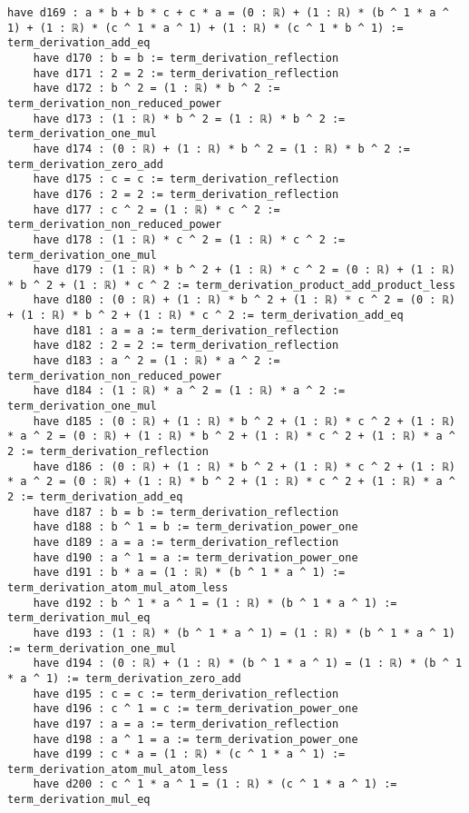 \documentclass{article}
\begin{document}
\begin{tcolorbox}[colback=white!10, width=\linewidth]
\begin{lstlisting}[language=Lean4]
    have d169 : a * b + b * c + c * a = (0 : ℝ) + (1 : ℝ) * (b ^ 1 * a ^ 1) + (1 : ℝ) * (c ^ 1 * a ^ 1) + (1 : ℝ) * (c ^ 1 * b ^ 1) := term_derivation_add_eq
    have d170 : b = b := term_derivation_reflection
    have d171 : 2 = 2 := term_derivation_reflection
    have d172 : b ^ 2 = (1 : ℝ) * b ^ 2 := term_derivation_non_reduced_power
    have d173 : (1 : ℝ) * b ^ 2 = (1 : ℝ) * b ^ 2 := term_derivation_one_mul
    have d174 : (0 : ℝ) + (1 : ℝ) * b ^ 2 = (1 : ℝ) * b ^ 2 := term_derivation_zero_add
    have d175 : c = c := term_derivation_reflection
    have d176 : 2 = 2 := term_derivation_reflection
    have d177 : c ^ 2 = (1 : ℝ) * c ^ 2 := term_derivation_non_reduced_power
    have d178 : (1 : ℝ) * c ^ 2 = (1 : ℝ) * c ^ 2 := term_derivation_one_mul
    have d179 : (1 : ℝ) * b ^ 2 + (1 : ℝ) * c ^ 2 = (0 : ℝ) + (1 : ℝ) * b ^ 2 + (1 : ℝ) * c ^ 2 := term_derivation_product_add_product_less
    have d180 : (0 : ℝ) + (1 : ℝ) * b ^ 2 + (1 : ℝ) * c ^ 2 = (0 : ℝ) + (1 : ℝ) * b ^ 2 + (1 : ℝ) * c ^ 2 := term_derivation_add_eq
    have d181 : a = a := term_derivation_reflection
    have d182 : 2 = 2 := term_derivation_reflection
    have d183 : a ^ 2 = (1 : ℝ) * a ^ 2 := term_derivation_non_reduced_power
    have d184 : (1 : ℝ) * a ^ 2 = (1 : ℝ) * a ^ 2 := term_derivation_one_mul
    have d185 : (0 : ℝ) + (1 : ℝ) * b ^ 2 + (1 : ℝ) * c ^ 2 + (1 : ℝ) * a ^ 2 = (0 : ℝ) + (1 : ℝ) * b ^ 2 + (1 : ℝ) * c ^ 2 + (1 : ℝ) * a ^ 2 := term_derivation_reflection
    have d186 : (0 : ℝ) + (1 : ℝ) * b ^ 2 + (1 : ℝ) * c ^ 2 + (1 : ℝ) * a ^ 2 = (0 : ℝ) + (1 : ℝ) * b ^ 2 + (1 : ℝ) * c ^ 2 + (1 : ℝ) * a ^ 2 := term_derivation_add_eq
    have d187 : b = b := term_derivation_reflection
    have d188 : b ^ 1 = b := term_derivation_power_one
    have d189 : a = a := term_derivation_reflection
    have d190 : a ^ 1 = a := term_derivation_power_one
    have d191 : b * a = (1 : ℝ) * (b ^ 1 * a ^ 1) := term_derivation_atom_mul_atom_less
    have d192 : b ^ 1 * a ^ 1 = (1 : ℝ) * (b ^ 1 * a ^ 1) := term_derivation_mul_eq
    have d193 : (1 : ℝ) * (b ^ 1 * a ^ 1) = (1 : ℝ) * (b ^ 1 * a ^ 1) := term_derivation_one_mul
    have d194 : (0 : ℝ) + (1 : ℝ) * (b ^ 1 * a ^ 1) = (1 : ℝ) * (b ^ 1 * a ^ 1) := term_derivation_zero_add
    have d195 : c = c := term_derivation_reflection
    have d196 : c ^ 1 = c := term_derivation_power_one
    have d197 : a = a := term_derivation_reflection
    have d198 : a ^ 1 = a := term_derivation_power_one
    have d199 : c * a = (1 : ℝ) * (c ^ 1 * a ^ 1) := term_derivation_atom_mul_atom_less
    have d200 : c ^ 1 * a ^ 1 = (1 : ℝ) * (c ^ 1 * a ^ 1) := term_derivation_mul_eq

\end{lstlisting}
\end{tcolorbox}
\end{document}
